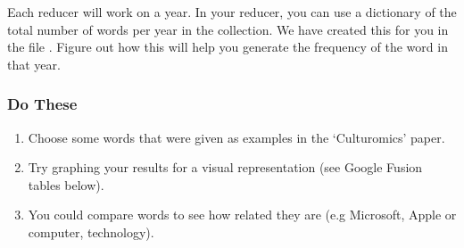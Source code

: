 \documentclass[letterpaper,10pt,openany,oneside]{sphinxmanual}
\begin{document}
Each reducer will work on a year. In your reducer, you can use a
dictionary of the total number of words per year in the collection.
We have created this for you in the file .
Figure out how this will help you generate the frequency of the
word in that year.


\subsubsection{Do These}
\label{WmrActivities/WmrActivities:do-these}\begin{enumerate}
\item {} 
Choose some words that were given as examples in the
`Culturomics' paper.

\item {} 
Try graphing your results for a visual representation (see
Google Fusion tables below).

\item {} 
You could compare words to see how related they are (e.g
Microsoft, Apple or computer, technology).

\end{enumerate}
\end{document}
